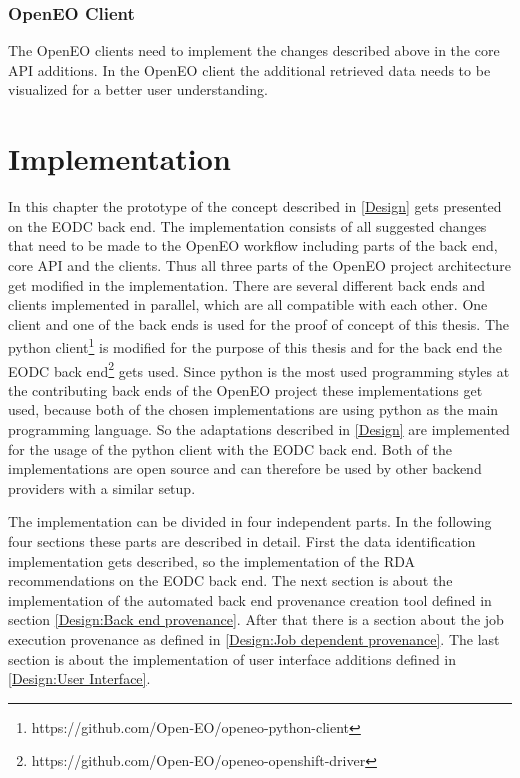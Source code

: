 \documentclass[draft,final]{vutinfth} %
\begin{document}
\subsection{OpenEO Client}\label{Design:OpenEO Client}
The OpenEO clients need to implement the changes described above in the core API additions. In the OpenEO client the additional retrieved data needs to be visualized for a better user understanding.


\chapter{Implementation}\label{Implementation}
In this chapter the prototype of the concept described in \ref{Design} gets presented on the EODC back end. The implementation consists of all suggested changes that need to be made to the OpenEO workflow including parts of the back end, core API and the clients. Thus all three parts of the OpenEO project architecture get modified in the implementation. There are several different back ends and clients implemented in parallel, which are all compatible with each other. One client and one of the back ends is used for the proof of concept of this thesis. The python client\footnote{https://github.com/Open-EO/openeo-python-client} is modified for the purpose of this thesis and for the back end the EODC back end\footnote{https://github.com/Open-EO/openeo-openshift-driver} gets used. Since python is the most used programming styles at the contributing back ends of the OpenEO project these implementations get used, because both of the chosen implementations are using python as the main programming language. So the adaptations described in \ref{Design} are implemented for the usage of the python client with the EODC back end. Both of the implementations are open source and can therefore be used by other backend providers with a similar setup.  

The implementation can be divided in four independent parts. In the following four sections these parts are described in detail. First the data identification implementation gets described, so the implementation of the RDA recommendations on the EODC back end. The next section is about the implementation of the automated back end provenance creation tool defined in section \ref{Design:Back end provenance}. After that there is a section about the job execution provenance as defined in \ref{Design:Job dependent provenance}. The last section is about the implementation of user interface additions defined in \ref{Design:User Interface}.     
\end{document}

